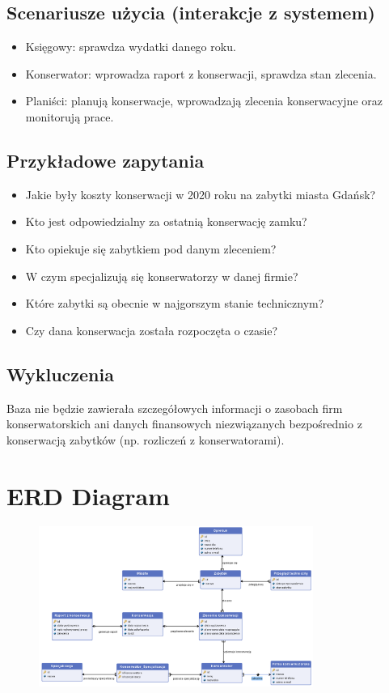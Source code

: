\documentclass{article}
\begin{document}
\subsection{Scenariusze użycia (interakcje z systemem)}
\begin{itemize}
    \item Księgowy: sprawdza wydatki danego roku. 
    \item Konserwator: wprowadza raport z konserwacji, sprawdza stan zlecenia. 
    \item Planiści: planują konserwacje, wprowadzają zlecenia konserwacyjne oraz monitorują prace. 
\end{itemize}

\subsection{Przykładowe zapytania}
\begin{itemize}
    \item Jakie były koszty konserwacji w 2020 roku na zabytki miasta Gdańsk?
    \item Kto jest odpowiedzialny za ostatnią konserwację zamku?
    \item Kto opiekuje się zabytkiem pod danym zleceniem?
    \item W czym specjalizują się konserwatorzy w danej firmie? 
    \item Które zabytki są obecnie w najgorszym stanie technicznym?
    \item Czy dana konserwacja została rozpoczęta o czasie?
\end{itemize}

\subsection{Wykluczenia}
Baza nie będzie zawierała szczegółowych informacji o zasobach firm konserwatorskich ani danych finansowych niezwiązanych bezpośrednio z konserwacją zabytków (np. rozliczeń z konserwatorami). 

\section{ERD Diagram}
\begin{figure}[H]
    \centering
    \includegraphics[width=0.8\textwidth]{diagram.png}
    \label{fig:diagram}
\end{figure}
\end{document}
